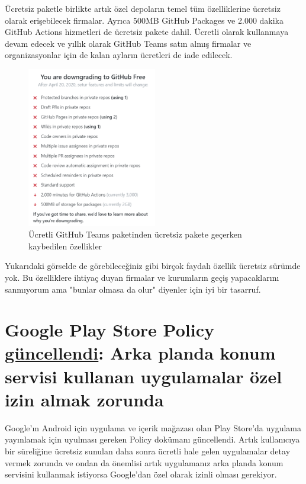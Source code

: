 \documentclass[11pt]{article}
\begin{document}
Ücretsiz paketle birlikte artık özel depoların temel tüm özelliklerine
ücretsiz olarak erişebilecek firmalar. Ayrıca 500MB GitHub Packages ve 2.000
dakika GitHub Actions hizmetleri de ücretsiz pakete dahil. Ücretli olarak
kullanmaya devam edecek ve yıllık olarak GitHub Teams satın almış firmalar
ve organizasyonlar için de kalan ayların ücretleri de iade edilecek.

\begin{figure}[htbp]
\centering
\includegraphics[height=7cm]{gorseller/github-free-limits.png}
\caption{Ücretli GitHub Teams paketinden ücretsiz pakete geçerken kaybedilen özellikler}
\end{figure}

Yukarıdaki görselde de görebileceğiniz gibi birçok faydalı özellik ücretsiz
sürümde yok. Bu özelliklere ihtiyaç duyan firmalar ve kurumların geçiş
yapacaklarını sanmıyorum ama "bunlar olmasa da olur" diyenler için iyi bir
tasarruf.
\section{Google Play Store Policy \href{https://www.androidpolice.com/2020/04/16/play-store-app-policy-changes-misleading-subscriptions-android-11-location/}{güncellendi}: Arka planda konum servisi kullanan uygulamalar özel izin almak zorunda}
\label{sec:orgc541c03}
Google'ın Android için uygulama ve içerik mağazası olan Play Store'da uygulama
yayınlamak için uyulması gereken Policy dokümanı güncellendi. Artık
kullanıcıya bir süreliğine ücretsiz sunulan daha sonra ücretli hale gelen
uygulamalar detay vermek zorunda ve ondan da önemlisi artık uygulamanız
arka planda konum servisini kullanmak istiyorsa Google'dan özel olarak izinli
olması gerekiyor.
\end{document}
